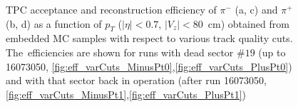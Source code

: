 \begin{figure}[h!]
{\begin{subfigure}[b]{\linewidth}
		\end{subfigure}
	}%
	\parbox{0.49\textwidth}{
		\centering
		\begin{subfigure}[b]{\linewidth}\centering
		\end{subfigure}
	}
	\caption[TPC acceptance and reconstruction efficiency of $\pi^{-}$ and $\pi^+$ as a function of $p_T$ obtained from embedded MC samples with respect to various track quality cuts.]{TPC acceptance and reconstruction efficiency of $\pi^{-}$ (a, c) and $\pi^+$ (b, d) as a function of $p_T$ ($|\eta| < 0.7$, $|V_z|<80$~cm) obtained from embedded MC samples with respect to various track quality cuts. The~efficiencies are shown for runs with dead sector $\#19$ (up to 16073050, \ref{fig:eff_varCuts_MinusPt0},\ref{fig:eff_varCuts_PlusPt0}) and with that sector back in operation (after run 16073050, \ref{fig:eff_varCuts_MinusPt1},\ref{fig:eff_varCuts_PlusPt1})}\label{fig:tpcEff_VarCuts_pt}
\end{figure}

